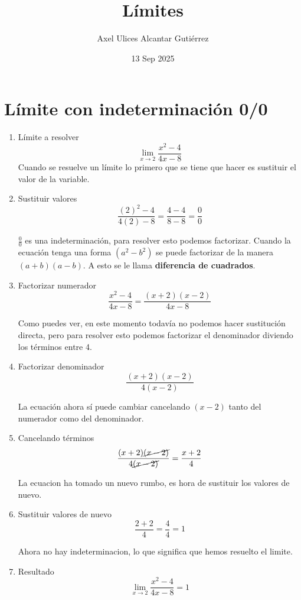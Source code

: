 \documentclass[a4paper,10pt]{article}
\title{Límites}
\author{Axel Ulices Alcantar Gutiérrez}
\date{13 Sep 2025}
\begin{document}
\maketitle

\section{Límite con indeterminación 0/0}

\begin{enumerate}
	\item Límite a resolver
	      $$\lim_{x\to2}\frac{x^{2} - 4}{4x - 8}$$
	      Cuando se resuelve un límite lo primero que se tiene que hacer es sustituir el valor de la variable.

	\item Sustituir valores
	      $$\frac{(2)^{2} - 4}{4(2) - 8} = \frac{4 - 4}{8 - 8} = \frac{0}{0}$$

	      $\frac{0}{0}$ es una indeterminación, para resolver esto podemos factorizar. Cuando la ecuación tenga una forma $(a^2 - b^2)$ se puede factorizar de la manera $(a + b)(a - b)$. A esto se le llama \textbf{diferencia de cuadrados}.

	\item Factorizar numerador
	      $$\frac{x^{2} - 4}{4x - 8} = \frac{(x + 2)(x - 2)}{4x - 8}$$

	      Como puedes ver, en este momento todavía no podemos hacer sustitución directa, pero para resolver esto podemos factorizar el denominador diviendo los términos entre 4.

	\item Factorizar denominador
	      $$\frac{(x + 2)(x - 2)}{4(x - 2)}$$

	      La ecuación ahora sí puede cambiar cancelando $(x - 2)$ tanto del numerador como del denominador.

	\item Cancelando términos
	      $$\frac{(x + 2)\cancel{(x - 2)}}{4\cancel{(x - 2)}} = \frac{x + 2}{4}$$

	      La ecuacion ha tomado un nuevo rumbo, es hora de sustituir los valores de nuevo.

	\item Sustituir valores de nuevo
	      $$\frac{2 + 2}{4} = \frac{4}{4} = 1$$

	      Ahora no hay indeterminacion, lo que significa que hemos resuelto el limite.

	\item Resultado
	      $$\boxed{\lim_{x\to2}\frac{x^{2} - 4}{4x - 8} = 1}$$

\end{enumerate}
\end{document}

